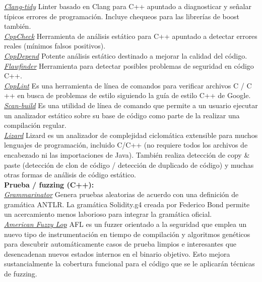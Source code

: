 \underline{\textit{Clang-tidy}}\cite{ClangTidyLink}
Linter basado en Clang para C++ apuntado a diagnosticar y señalar típicos errores de programación. Incluye chequeos para las librerías de boost también.\\

\underline{\textit{CppCheck}}\cite{CppCheckLink}
Herramienta de análisis estático para C++ apuntado a detectar errores reales (mínimos falsos positivos).\\

\underline{\textit{CppDepend}}\cite{CppDependLink}
Potente análisis estático destinado a mejorar la calidad del código.\\

\underline{\textit{Flawfinder}}\cite{FlawfinderLink}
Herramienta para detectar posibles problemas de seguridad en código C++.\\

\underline{\textit{CppLint}}\cite{CppLintLink}
Es una herramienta de línea de comandos para verificar archivos C / C ++ en busca de problemas de estilo siguiendo la guía de estilo C++ de Google.\\

\underline{\textit{Scan-build}}\cite{ScanBuildLink}
Es una utilidad de línea de comando que permite a un usuario ejecutar un analizador estático sobre su base de código como parte de la realizar una compilación regular.\\

\underline{\textit{Lizard}}\cite{LizardLink}
Lizard es un analizador de complejidad ciclomática extensible para muchos lenguajes de programación, incluido C/C++ (no requiere todos los archivos de encabezado ni las importaciones de Java). También realiza detección de copy \& paste (detección de clon de código / detección de duplicado de código) y muchas otras formas de análisis de código estático.\\

\textbf{Prueba / fuzzing (C++):}\\

\underline{\textit{Grammarinator}}\cite{GrammarinatorLink}
Genera pruebas aleatorias de acuerdo con una definición de gramática ANTLR. La gramática Solidity.g4\cite{SolidityG4} creada por Federico Bond permite un acercamiento menos laborioso para integrar la gramática oficial.\\

\underline{\textit{American Fuzzy Lop}}\cite{AFLLink}
AFL es un fuzzer orientado a la seguridad que emplea un nuevo tipo de instrumentación en tiempo de compilación y algoritmos genéticos para descubrir automáticamente casos de prueba limpios e interesantes que desencadenan nuevos estados internos en el binario objetivo. Esto mejora sustancialmente la cobertura funcional para el código  que se le aplicarán técnicas de fuzzing.\\

